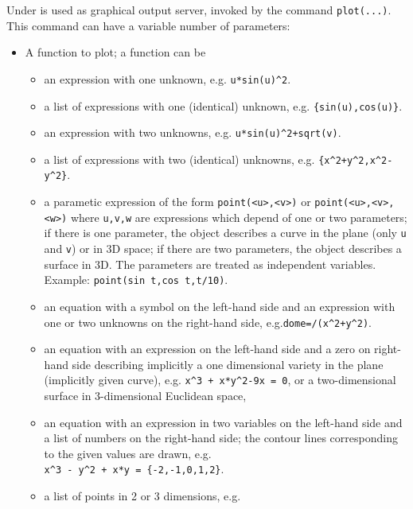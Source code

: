 Under {\REDUCE} {\Gnuplot} is used as graphical output server, invoked by the
command \texttt{plot(...)}.  This command can have a variable number of
parameters:
\begin{itemize}
\item A function to plot; a function can be
  \begin{itemize}
    \item an expression with one unknown, e.g. \texttt{u*sin(u)\^{}2}.
    \item a list of expressions with one (identical) unknown,
      e.g. \texttt{\{sin(u),\allowbreak cos(u)\}}.
    \item an expression with two unknowns, e.g. \texttt{u*sin(u)\^{}2+sqrt(v)}.
    \item a list of expressions with two (identical) unknowns,
      e.g. \linebreak
      \texttt{\{x\textasciicircum{2}+y\textasciicircum{2},\allowbreak x\textasciicircum{2}-y\textasciicircum{2}\}}.
    \item a parametic expression of the form \texttt{point(<u>,<v>)} or
      \texttt{point(<u>,\allowbreak <v>,<w>)} where \texttt{u,v,w} are
      expressions which depend of one or two parameters; if there is one
      parameter, the object describes a curve in the plane (only \texttt{u} and
      \texttt{v}) or in 3D space; if there are two parameters, the object
      describes a surface in 3D. The parameters are treated as independent
      variables.  Example: \texttt{point(sin t,cos t,t/10)}.
    \item an equation with a symbol on the left-hand side and an expression with
      one or two unknowns on the right-hand side, e.g.\linebreak[3]
      \texttt{dome=/(x\^{}2+y\^{}2)}.
    \item an equation with an expression on the left-hand side and a zero on
      right-hand side describing implicitly a one dimensional variety in the
      plane (implicitly given curve), e.g.
      \texttt{x\^{}3 + x*y\^{}2-9x = 0}, or a
      two-dimensional surface in 3-dimensional Euclidean space,
    \item an equation with an expression in two variables on the left-hand side
      and a list of numbers on the right-hand side; the contour lines
      corresponding to the given values are drawn, e.g. \\
      \texttt{x\^{}3 - y\^{}2 + x*y = \{-2,-1,0,1,2\}}.
    \item a list of points in 2 or 3 dimensions, e.g.

\end{itemize}
\end{itemize}
